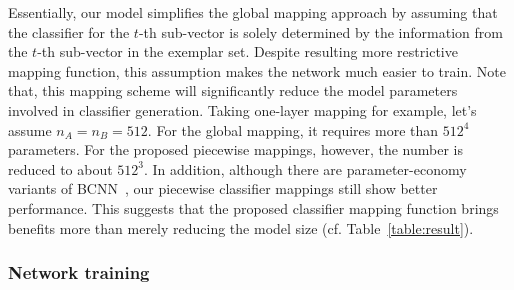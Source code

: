 \documentclass[10pt,twocolumn,letterpaper]{article}
\begin{document}
Essentially, our model simplifies the global mapping approach by assuming that the classifier for the $t$-th sub-vector is solely determined by the information from the $t$-th sub-vector in the exemplar set. Despite resulting more restrictive mapping function, this assumption makes the network much easier to train.  
Note that, this mapping scheme will significantly reduce the model parameters involved in classifier generation. Taking one-layer mapping for example, let's assume $n_A=n_B=512$. For the global mapping, it requires more than $512^4$ parameters. For the proposed piecewise mappings, however, the number is reduced to about $512^3$. In addition, although there are parameter-economy variants of BCNN~\cite{CB16CVPR}, our piecewise classifier mappings still show better performance. This suggests that the proposed classifier mapping function brings benefits more than merely reducing the model size (cf. Table~\ref{table:result}).

\subsubsection{Network training}
\end{document}
